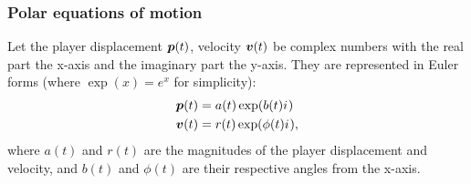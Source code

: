 
\subsubsection{Polar equations of motion}
Let the player displacement $\boldsymbol{p}(t)$, velocity $\boldsymbol{v}(t)$ be complex numbers with the real part the x-axis and the imaginary part the y-axis. They are represented in Euler forms (where $\exp(x)= e^{x}$ for simplicity):
\begin{align*}
    \boldsymbol{p}(t) &= a(t) \exp(b(t) {i\mkern1mu})\\
    \boldsymbol{v}(t) &= r(t) \exp(\phi(t) {i\mkern1mu}),
\end{align*}
where $a(t)$ and $r(t)$ are the magnitudes of the player displacement and velocity, and $b(t)$ and $\phi(t)$ are their respective angles from the x-axis.

